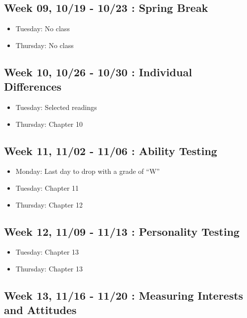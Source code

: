 \documentclass[11pt,]{article}
\providecommand{\tightlist}{%
  \setlength{\itemsep}{0pt}\setlength{\parskip}{0pt}}
\begin{document}
\subsection{Week 09, 10/19 - 10/23 : Spring
Break}\label{week-09-1019---1023-spring-break}

\begin{itemize}
\tightlist
\item
  Tuesday: No class
\item
  Thursday: No class
\end{itemize}

\subsection{Week 10, 10/26 - 10/30 : Individual
Differences}\label{week-10-1026---1030-individual-differences}

\begin{itemize}
\tightlist
\item
  Tuesday: Selected readings
\item
  Thursday: Chapter 10
\end{itemize}

\subsection{Week 11, 11/02 - 11/06 : Ability
Testing}\label{week-11-1102---1106-ability-testing}

\begin{itemize}
\tightlist
\item
  Monday: Last day to drop with a grade of ``W''
\item
  Tuesday: Chapter 11
\item
  Thursday: Chapter 12
\end{itemize}

\subsection{Week 12, 11/09 - 11/13 : Personality
Testing}\label{week-12-1109---1113-personality-testing}

\begin{itemize}
\tightlist
\item
  Tuesday: Chapter 13
\item
  Thursday: Chapter 13
\end{itemize}

\subsection{Week 13, 11/16 - 11/20 : Measuring Interests and
Attitudes}\label{week-13-1116---1120-measuring-interests-and-attitudes}
\end{document}
